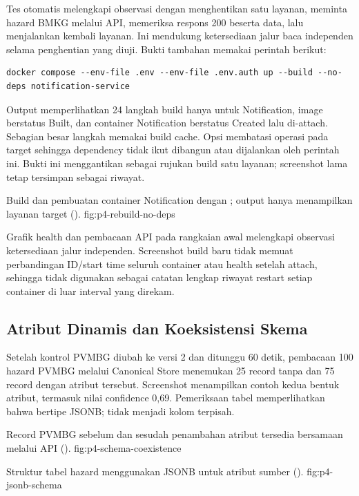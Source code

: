 Tes otomatis  melengkapi observasi dengan
menghentikan satu layanan, meminta hazard BMKG melalui API, memeriksa
respons 200 beserta data, lalu menjalankan kembali layanan. Ini mendukung
ketersediaan jalur baca independen selama penghentian yang diuji.
Bukti tambahan  memakai perintah berikut:
\begin{lstlisting}
docker compose --env-file .env --env-file .env.auth up --build --no-deps notification-service
\end{lstlisting}
Output memperlihatkan 24 langkah build hanya untuk Notification, image
berstatus Built, dan container Notification berstatus Created lalu di-attach.
Sebagian besar langkah memakai build cache. Opsi  membatasi
operasi pada target sehingga dependency tidak ikut dibangun atau dijalankan
oleh perintah ini. Bukti ini menggantikan  sebagai rujukan
build satu layanan; screenshot lama tetap tersimpan sebagai riwayat.

{Build dan pembuatan container Notification dengan ; output hanya menampilkan layanan target ().}
{fig:p4-rebuild-no-deps}

Grafik health dan pembacaan API pada rangkaian awal melengkapi observasi
ketersediaan jalur independen. Screenshot build baru tidak memuat
perbandingan ID/start time seluruh container atau health setelah attach,
sehingga tidak digunakan sebagai catatan lengkap riwayat restart setiap
container di luar interval yang direkam.

\subsection{Atribut Dinamis dan Koeksistensi Skema}

Setelah kontrol PVMBG diubah ke versi 2 dan ditunggu 60 detik, pembacaan
100 hazard PVMBG melalui Canonical Store menemukan 25 record tanpa
 dan 75 record dengan atribut tersebut. Screenshot
menampilkan contoh kedua bentuk atribut, termasuk nilai confidence 0,69.
Pemeriksaan tabel memperlihatkan bahwa  bertipe JSONB;
 tidak menjadi kolom terpisah.

{Record PVMBG sebelum dan sesudah penambahan atribut tersedia bersamaan melalui API ().}
{fig:p4-schema-coexistence}

{Struktur tabel hazard menggunakan JSONB untuk atribut sumber ().}
{fig:p4-jsonb-schema}

